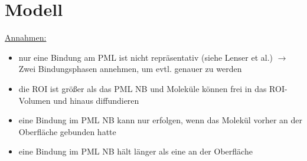 \chapter{Modell}
\underline{Annahmen:}
\begin{itemize}
	\item nur eine Bindung am PML ist nicht repräsentativ (siehe Lenser et al.)
	\newline
	$\rightarrow$ Zwei Bindungsphasen annehmen, um evtl. genauer zu werden
	\item die ROI ist größer als das PML NB und Moleküle können frei in das ROI-Volumen und hinaus diffundieren
	\item eine Bindung im PML NB kann nur erfolgen, wenn das Molekül vorher an der Oberfläche gebunden hatte
	\item eine Bindung im PML NB hält länger als eine an der Oberfläche
\end{itemize}

